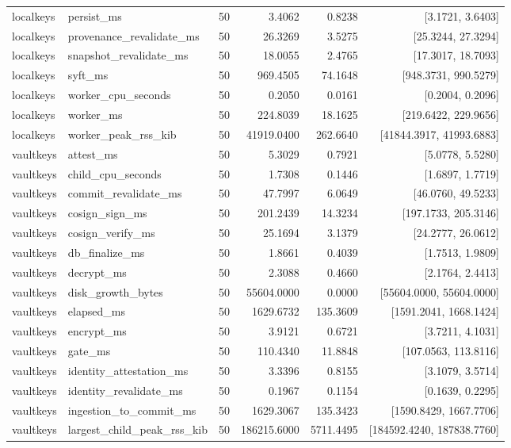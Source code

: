 \begin{tabular}{llrrrr}
localkeys & persist\_ms & 50 & 3.4062 & 0.8238 & [3.1721, 3.6403] \\
localkeys & provenance\_revalidate\_ms & 50 & 26.3269 & 3.5275 & [25.3244, 27.3294] \\
localkeys & snapshot\_revalidate\_ms & 50 & 18.0055 & 2.4765 & [17.3017, 18.7093] \\
localkeys & syft\_ms & 50 & 969.4505 & 74.1648 & [948.3731, 990.5279] \\
localkeys & worker\_cpu\_seconds & 50 & 0.2050 & 0.0161 & [0.2004, 0.2096] \\
localkeys & worker\_ms & 50 & 224.8039 & 18.1625 & [219.6422, 229.9656] \\
localkeys & worker\_peak\_rss\_kib & 50 & 41919.0400 & 262.6640 & [41844.3917, 41993.6883] \\
vaultkeys & attest\_ms & 50 & 5.3029 & 0.7921 & [5.0778, 5.5280] \\
vaultkeys & child\_cpu\_seconds & 50 & 1.7308 & 0.1446 & [1.6897, 1.7719] \\
vaultkeys & commit\_revalidate\_ms & 50 & 47.7997 & 6.0649 & [46.0760, 49.5233] \\
vaultkeys & cosign\_sign\_ms & 50 & 201.2439 & 14.3234 & [197.1733, 205.3146] \\
vaultkeys & cosign\_verify\_ms & 50 & 25.1694 & 3.1379 & [24.2777, 26.0612] \\
vaultkeys & db\_finalize\_ms & 50 & 1.8661 & 0.4039 & [1.7513, 1.9809] \\
vaultkeys & decrypt\_ms & 50 & 2.3088 & 0.4660 & [2.1764, 2.4413] \\
vaultkeys & disk\_growth\_bytes & 50 & 55604.0000 & 0.0000 & [55604.0000, 55604.0000] \\
vaultkeys & elapsed\_ms & 50 & 1629.6732 & 135.3609 & [1591.2041, 1668.1424] \\
vaultkeys & encrypt\_ms & 50 & 3.9121 & 0.6721 & [3.7211, 4.1031] \\
vaultkeys & gate\_ms & 50 & 110.4340 & 11.8848 & [107.0563, 113.8116] \\
vaultkeys & identity\_attestation\_ms & 50 & 3.3396 & 0.8155 & [3.1079, 3.5714] \\
vaultkeys & identity\_revalidate\_ms & 50 & 0.1967 & 0.1154 & [0.1639, 0.2295] \\
vaultkeys & ingestion\_to\_commit\_ms & 50 & 1629.3067 & 135.3423 & [1590.8429, 1667.7706] \\
vaultkeys & largest\_child\_peak\_rss\_kib & 50 & 186215.6000 & 5711.4495 & [184592.4240, 187838.7760] \\

\end{tabular}
